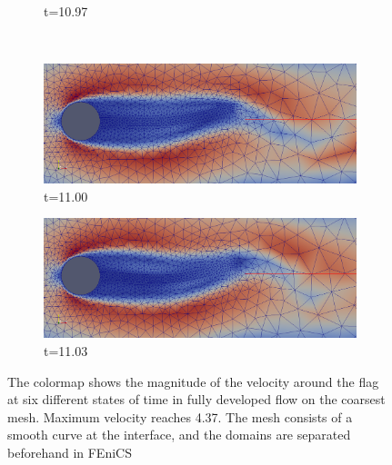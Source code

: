 \begin{center}
\begin{figure}[!ht]
\begin{subfigure}[b]{0.5\linewidth}
\caption{t=10.97}
\end{subfigure} \\
\begin{subfigure}[b]{0.5\linewidth}
\includegraphics[width=\linewidth]{figures/FSI3/coarse/FSI_mesh_5}
\caption{t=11.00}
\end{subfigure}
\begin{subfigure}[b]{0.5\linewidth}
\includegraphics[width=\linewidth]{figures/FSI3/coarse/FSI_mesh_6}
\caption{t=11.03}
\end{subfigure}
\caption{The colormap shows the magnitude of the velocity around the flag at six different states of time in fully developed flow on the coarsest mesh. Maximum velocity reaches 4.37. The mesh consists of a smooth curve at the interface, and the domains are separated beforehand in FEniCS}
\end{figure}
\end{center}
\clearpage



